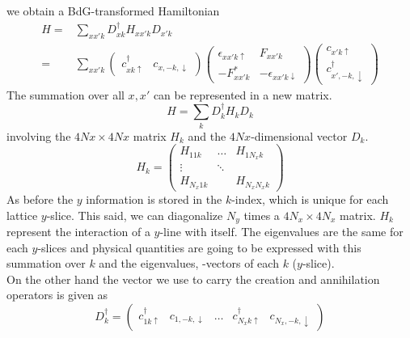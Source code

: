 \documentclass[../main.tex]{subfile}
\begin{document}
we obtain a BdG-transformed Hamiltonian
\begin{align*}
    H =& \sum_{xx'k} D_{xk}^{\dagger} H_{xx'k} D_{x'k}\\
      =& \sum_{xx'k} \begin{pmatrix}
        c^{\dagger}_{xk\uparrow} & c_{x,-k,\downarrow}
      \end{pmatrix}
        \begin{pmatrix}
            \epsilon_{xx'k\uparrow} & F_{xx'k}\\
            -F_{xx'k}^{\ast} & -\epsilon_{xx'k\downarrow}
        \end{pmatrix}
        \begin{pmatrix}
            c_{x'k\uparrow}\\
            c^{\dagger}_{x',-k,\downarrow}
        \end{pmatrix}
\end{align*}
The summation over all $x,x'$ can be represented in a new matrix.
\[
    H = \sum_k D_k^{\dagger} H_k D_k
\]
involving the $4Nx \times 4Nx$ matrix $H_k$ and the $4Nx$-dimensional vector $D_k$.
\[
    H_k = \begin{pmatrix}
        H_{11k} &\dots & H_{1N_xk}\\
        \vdots&\ddots&\\
        H_{N_x1k} & & H_{N_xN_xk}
    \end{pmatrix}
\]
As before the $y$ information is stored in the $k$-index, which is unique for each lattice $y$-slice. This said, we 
can diagonalize $N_y$ times a $4N_x \times 4N_x$ matrix. $H_k$ represent the interaction of a $y$-line with itself.
The eigenvalues are the same for each $y$-slices and physical
quantities are going to be expressed with this summation over $k$ and the eigenvalues, -vectors of each $k$ ($y$-slice).\\

On the other hand the vector we use to carry the creation and annihilation operators is given as 
\[
    D_k^{\dagger} = \begin{pmatrix}
        c^{\dagger}_{1k\uparrow} & c_{1,-k,\downarrow}& \dots &c^{\dagger}_{N_x k\uparrow} & c_{N_x,-k,\downarrow}
    \end{pmatrix}
\]
\end{document}
